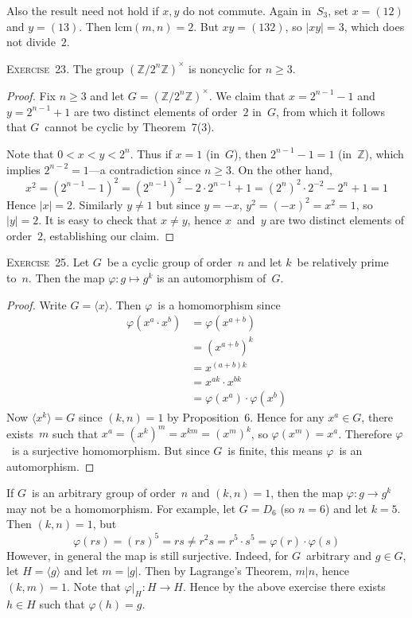\documentclass[letterpaper]{article}
\newcommand{\exercise}[1]{\goodbreak\noindent\textsc{Exercise~{#1}.}}
\newcommand{\Z}{\mathbb{Z}}
\newcommand{\lcm}[2]{\mathrm{lcm}({#1},{#2})}
\newcommand{\ord}[1]{|{#1}|}
\newcommand{\gen}[1]{\langle{#1}\rangle}
\begin{document}
Also the result need not hold if $x,y$ do not commute. Again in~$S_3$, set $x=(12)$ and $y=(13)$. Then $\lcm{m}{n}=2$. But $xy=(132)$, so $\ord{xy}=3$, which does not divide~$2$.

\bigskip
\exercise{23} The group $(\Z/2^n\Z)^{\times}$ is noncyclic for $n\ge3$.
\begin{proof}
Fix $n\ge3$ and let $G=(\Z/2^n\Z)^{\times}$. We claim that $x=2^{n-1}-1$ and $y=2^{n-1}+1$ are two distinct elements of order~$2$ in~$G$, from which it follows that $G$~cannot be cyclic by Theorem~7(3).

Note that $0<x<y<2^n$. Thus if $x=1$ (in~$G$), then $2^{n-1}-1=1$ (in~$\Z$), which implies $2^{n-2}=1$---a contradiction since $n\ge3$. On the other hand,
$$x^2=(2^{n-1}-1)^2=(2^{n-1})^2-2\cdot 2^{n-1}+1=(2^n)^2\cdot2^{-2}-2^n+1=1$$
Hence $\ord{x}=2$. Similarly $y\ne1$ but since $y=-x$, $y^2=(-x)^2=x^2=1$, so $\ord{y}=2$. It is easy to check that $x\ne y$, hence $x$~and~$y$ are two distinct elements of order~$2$, establishing our claim.
\end{proof}

\exercise{25}
Let $G$~be a cyclic group of order~$n$ and let $k$~be relatively prime to~$n$. Then the map $\varphi:g\mapsto g^k$ is an automorphism of~$G$.
\begin{proof}
Write $G=\gen{x}$. Then $\varphi$~is a homomorphism since
\begin{align*}
\varphi(x^a\cdot x^b)&=\varphi(x^{a+b})\\
	&=(x^{a+b})^k\\
	&=x^{(a+b)k}\\
	&=x^{ak}\cdot x^{bk}\\
	&=\varphi(x^a)\cdot\varphi(x^b)
\end{align*}
Now $\gen{x^k}=G$ since $(k,n)=1$ by Proposition~6. Hence for any $x^a\in G$, there exists~$m$ such that $x^a=(x^k)^m=x^{km}=(x^m)^k$, so $\varphi(x^m)=x^a$. Therefore $\varphi$~is a surjective homomorphism. But since $G$~is finite, this means $\varphi$~is an automorphism.
\end{proof}
\noindent If $G$~is an arbitrary group of order~$n$ and $(k,n)=1$, then the map $\varphi:g\to g^k$ may not be a homomorphism. For example, let $G=D_6$ (so $n=6$) and let $k=5$. Then $(k,n)=1$, but
$$\varphi(rs)=(rs)^5=rs\ne r^2s=r^5\cdot s^5=\varphi(r)\cdot\varphi(s)$$
However, in general the map is still surjective. Indeed, for $G$~arbitrary and $g\in G$, let $H=\gen{g}$ and let $m=\ord{g}$. Then by Lagrange's Theorem, $m|n$, hence $(k,m)=1$. Note that $\varphi|_{H}:H\to H$. Hence by the above exercise there exists $h\in H$ such that $\varphi(h)=g$.
\end{document}
